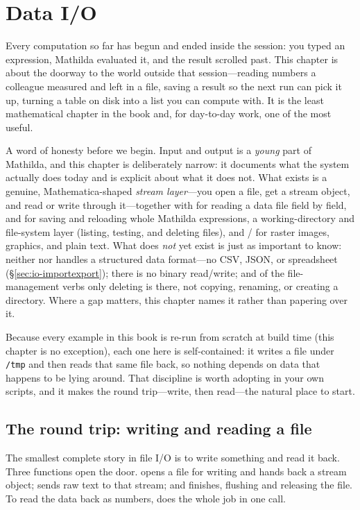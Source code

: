 \chapter{Data I/O}
\label{ch:dataio}

Every computation so far has begun and ended inside the session: you typed an
expression, Mathilda evaluated it, and the result scrolled past. This chapter is
about the doorway to the world outside that session---reading numbers a
colleague measured and left in a file, saving a result so the next run can pick
it up, turning a table on disk into a list you can compute with. It is the least
mathematical chapter in the book and, for day-to-day work, one of the most
useful.

A word of honesty before we begin. Input and output is a \emph{young} part of
Mathilda, and this chapter is deliberately narrow: it documents what the system
actually does today and is explicit about what it does not. What exists is a
genuine, Mathematica-shaped \emph{stream layer}---you open a file, get a stream
object, and read or write through it---together with  for reading a
data file field by field,  and  for saving and reloading whole
Mathilda expressions, a working-directory and file-system layer (listing,
testing, and deleting files), and / for raster images,
graphics, and plain text. What does \emph{not} yet exist is just as important to know:
neither  nor  handles a structured data format---no CSV,
JSON, or spreadsheet (\S\ref{sec:io-importexport}); there is no binary
read/write; and of the file-management verbs only deleting is there, not copying,
renaming, or creating a directory. Where a gap matters, this chapter names it
rather than papering over it.

Because every example in this book is re-run from scratch at build time (this
chapter is no exception), each one here is self-contained: it writes a
file under \texttt{/tmp} and then reads that same file back, so nothing depends
on data that happens to be lying around. That discipline is worth adopting in
your own scripts, and it makes the round trip---write, then read---the natural
place to start.

\section{The round trip: writing and reading a file}
\label{sec:io-roundtrip}

The smallest complete story in file I/O is to write something and read it back.
Three functions open the door.  opens a file for writing and hands
back a stream object;  sends raw text to that stream; and 
finishes, flushing and releasing the file. To read the data back as numbers,
 does the whole job in one call.

